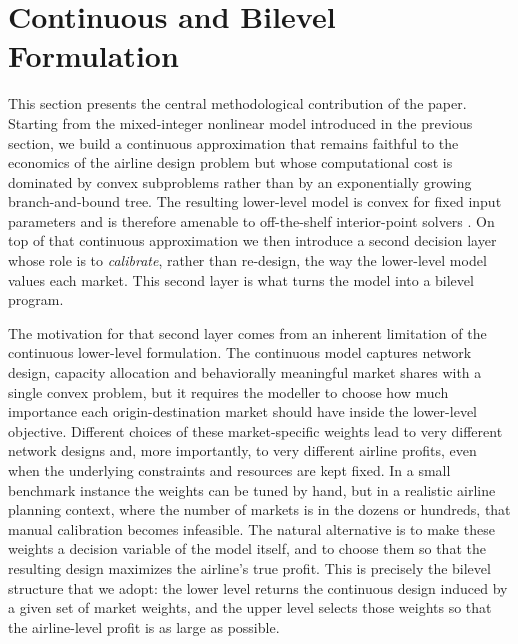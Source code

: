 \section{Continuous and Bilevel Formulation}
\label{sec:single_level}
This section presents the central methodological contribution of the paper. Starting from the mixed-integer nonlinear model introduced in the previous section, we build a continuous approximation that remains faithful to the economics of the airline design problem but whose computational cost is dominated by convex subproblems rather than by an exponentially growing branch-and-bound tree. The resulting lower-level model is convex for fixed input parameters and is therefore amenable to off-the-shelf interior-point solvers \cite{RealRojas2026TRB,RealRojas2025AIAA}. On top of that continuous approximation we then introduce a second decision layer whose role is to \emph{calibrate}, rather than re-design, the way the lower-level model values each market. This second layer is what turns the model into a bilevel program.

The motivation for that second layer comes from an inherent limitation of the continuous lower-level formulation. The continuous model captures network design, capacity allocation and behaviorally meaningful market shares with a single convex problem, but it requires the modeller to choose how much importance each origin-destination market should have inside the lower-level objective. Different choices of these market-specific weights lead to very different network designs and, more importantly, to very different airline profits, even when the underlying constraints and resources are kept fixed. In a small benchmark instance the weights can be tuned by hand, but in a realistic airline planning context, where the number of markets is in the dozens or hundreds, that manual calibration becomes infeasible. The natural alternative is to make these weights a decision variable of the model itself, and to choose them so that the resulting design maximizes the airline's true profit. This is precisely the bilevel structure that we adopt: the lower level returns the continuous design induced by a given set of market weights, and the upper level selects those weights so that the airline-level profit is as large as possible.

